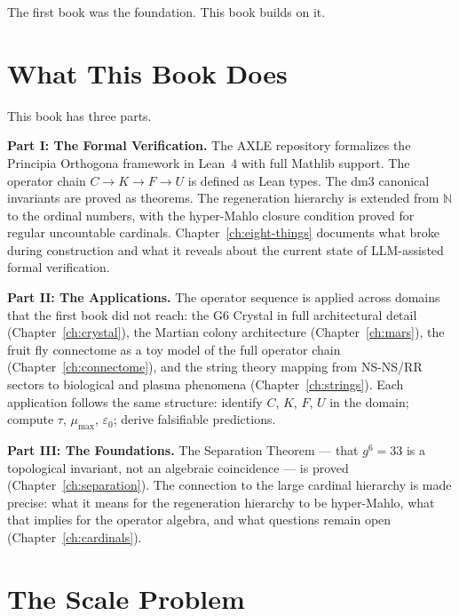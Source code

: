The first book was the foundation. This book builds on it.

\section{What This Book Does}
\label{sec:this-book}

This book has three parts.

\textbf{Part I: The Formal Verification.} The AXLE repository
formalizes the Principia Orthogona framework in Lean~4 with
full Mathlib support. The operator chain $C \to K \to F \to U$
is defined as Lean types. The dm3 canonical invariants are
proved as theorems. The regeneration hierarchy is extended from
$\mathbb{N}$ to the ordinal numbers, with the hyper-Mahlo
closure condition proved for regular uncountable cardinals.
Chapter~\ref{ch:eight-things} documents what broke during
construction and what it reveals about the current state of
LLM-assisted formal verification.

\textbf{Part II: The Applications.} The operator sequence
is applied across domains that the first book did not reach:
the G6 Crystal in full architectural detail (Chapter~\ref{ch:crystal}),
the Martian colony architecture (Chapter~\ref{ch:mars}),
the fruit fly connectome as a toy model of the full operator
chain (Chapter~\ref{ch:connectome}), and the string theory
mapping from NS-NS/RR sectors to biological and plasma
phenomena (Chapter~\ref{ch:strings}). Each application
follows the same structure: identify $C$, $K$, $F$, $U$
in the domain; compute $\tau$, $\mu_{\max}$, $\varepsilon_0$;
derive falsifiable predictions.

\textbf{Part III: The Foundations.} The Separation Theorem ---
that $g^6 = 33$ is a topological invariant, not an algebraic
coincidence --- is proved (Chapter~\ref{ch:separation}).
The connection to the large cardinal hierarchy is made precise:
what it means for the regeneration hierarchy to be hyper-Mahlo,
what that implies for the operator algebra, and what questions
remain open (Chapter~\ref{ch:cardinals}).

\section{The Scale Problem}
\label{sec:scale}

